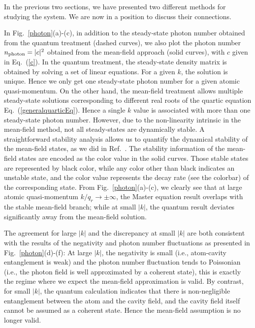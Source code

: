 \documentclass[atoms,article,submit,moreauthors,pdftex,12pt,a4paper]{mdpi}
\begin{document}
In the previous two sections, we have presented two different methods for studying the system. We are now in a position to discuss their connections. 

In Fig.~\ref{photon}(a)-(c), in addition to the steady-state photon number obtained from the quantum treatment (dashed curves), we also plot the photon number $n_{\rm photon}=|c|^2$ obtained from the mean-field approach (solid curves), with $c$ given in Eq.~(\ref{c}). In the quantum treatment, the steady-state density matrix is obtained by solving a set of linear equations. For a given $k$, the solution is unique. Hence we only get one steady-state photon number for a given atomic quasi-momentum. On the other hand, the mean-field treatment allows multiple steady-state solutions corresponding to different real roots of the quartic equation Eq.~(\ref{generalquarticEq}). Hence a single $k$ value is associated with more than one steady-state photon number. However, due to the non-linearity intrinsic in the mean-field method, not all steady-states are dynamically stable. A straightforward stability analysis allows us to quantify the dynamical stability of the mean-field states, as we did in Ref.~\cite{cavitySOC}. The stability information of the mean-field states are encoded as the color value in the solid curves. Those stable states are represented by black color, while any color other than black indicates an unstable state, and the color value represents the decay rate (see the colorbar) of the corresponding state. From Fig.~\ref{photon}(a)-(c), we clearly see that at large atomic quasi-momentum $k/q_r \rightarrow  \pm \infty$, the Master equation result overlaps with the stable mean-field branch; while at small $|k|$, the quantum result deviates significantly away from the mean-field solution.

The agreement for large $|k|$ and the discrepancy at small $|k|$ are both consistent with the results of the negativity and photon number fluctuations as presented in Fig.~\ref{photon}(d)-(f): At large $|k|$, the negativity is small (i.e., atom-cavity entanglement is weak) and the photon number fluctuation tends to Poissonian (i.e., the photon field is well approximated by a coherent state), this is exactly the regime where we expect the mean-field approximation is valid. By contrast, for small $|k|$, the quantum calculation indicates that there is non-negligible entanglement between the atom and the cavity field, and the cavity field itself cannot be assumed as a coherent state. Hence the mean-field assumption is no longer valid.
\end{document}

